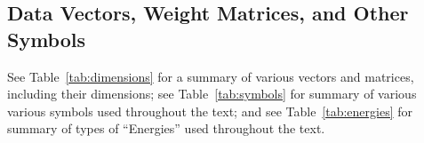 \subsection{Data Vectors, Weight Matrices, and Other Symbols}
\label{sxn:appendix_A}

See Table~\ref{tab:dimensions} for a summary of various vectors and matrices, including their dimensions;
see Table~\ref{tab:symbols} for summary of various various symbols used throughout the text; and 
see Table~\ref{tab:energies} for summary of types of ``Energies'' used throughout the text.


\renewcommand{\arraystretch}{1.2} %

